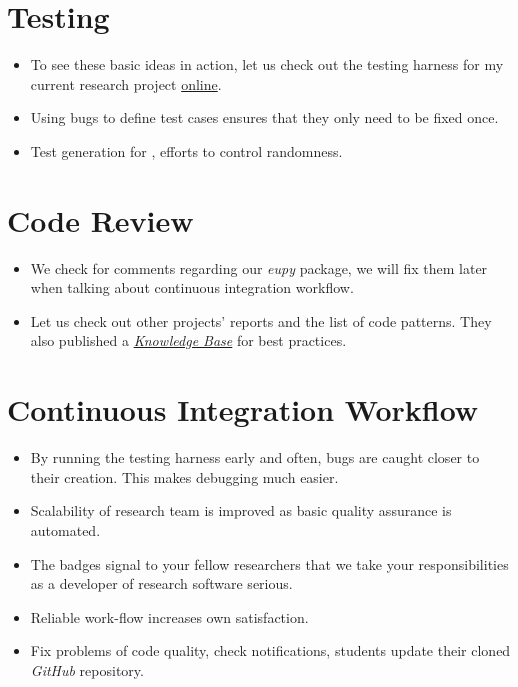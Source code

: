 \section{Testing}
\begin{itemize}
\item To see these basic ideas in action, let us check out the testing harness for my current research project \href{https://github.com/robustToolbox/package/tree/master/development/tests}{online}.
\item Using bugs to define test cases ensures that they only need to be fixed once.
\item Test generation for \citet{Eisenhauer.2016}, efforts to control randomness.
\end{itemize}
\section{Code Review}
\begin{itemize}
\item We check for comments regarding our \textit{eupy} package, we will fix them later when talking about continuous integration workflow.
\item Let us check out other projects' reports and the list of code patterns. They also published a \href{https://www.quantifiedcode.com/knowledge-base/}{\textit{Knowledge Base}} for best practices.
\end{itemize}
\section{Continuous Integration Workflow}
\begin{itemize}
\item By running the testing harness early and often, bugs are caught closer to their creation. This makes debugging much easier.
\item Scalability of research team is improved as basic quality assurance is automated.
\item The badges signal to your fellow researchers that we take your responsibilities as a developer of research software serious.
\item  Reliable work-flow increases own satisfaction.
\item Fix problems of code quality, check notifications, students update their cloned \textit{GitHub} repository.
\end{itemize}

